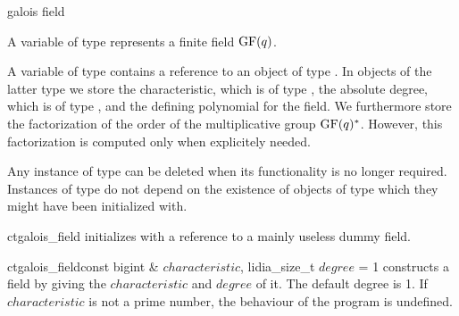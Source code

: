 
\newcommand{\degree}{\mathit{degree}}
\newcommand{\characteristic}{\mathit{characteristic}}



\NAME

 \dotfill galois field



\ABSTRACT

A variable of type  represents a finite field $\mathrm{GF}(q)$.



\DESCRIPTION

A variable of type  contains a reference to an object of type
.  In objects of the latter type we store the characteristic, which is of
type , the absolute degree, which is of type , and the defining
polynomial for the field.  We furthermore store the factorization of the order of the
multiplicative group $\mathrm{GF}(q)^*$.  However, this factorization is computed only when explicitely
needed.

Any instance of type  can be deleted when its functionality is no longer
required.  Instances of type  do not depend on the existence of objects of type
 which they might have been initialized with.



\CONS

\begin{fcode}{ct}{galois_field}{}
  initializes with a reference to a mainly useless dummy field.
\end{fcode}

\begin{fcode}{ct}{galois_field}{const bigint & $\characteristic$, lidia_size_t $\degree$ = 1}
  constructs a field by giving the $\characteristic$ and $\degree$ of it.  The default degree is
  1.  If $\characteristic$ is not a prime number, the behaviour of the program is undefined.
\end{fcode}

